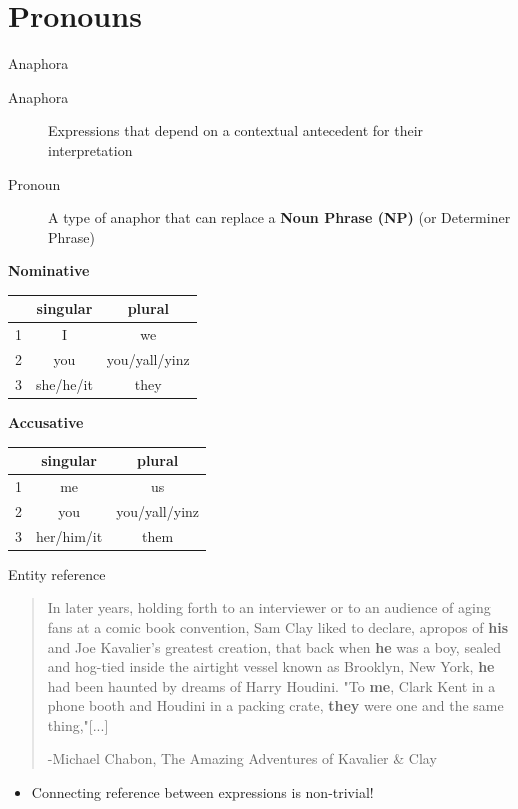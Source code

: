 \documentclass[10pt, compress]{beamer}		%
\begin{document}
\section{Pronouns}
\begin{frame}{Anaphora}
	\begin{description}
		\item[Anaphora] Expressions that depend on a contextual antecedent for their interpretation
		\item[Pronoun] A type of anaphor that can replace a \textbf{Noun Phrase (NP)} (or Determiner Phrase)
	\end{description}

	\begin{table}
		\begin{multicols}{2}

			{\bf Nominative}	\\
			\begin{tabular}{|r|cc|}
				\toprule
					&	singular	&	plural	\\
				\midrule
				1	&	I 	&	we 	\\
				2	&	you 	&	you/yall/yinz 	\\
				3	&	she/he/it &	they 	\\
				\bottomrule
			\end{tabular}

			{\bf Accusative}	\\
			\begin{tabular}{|r|cc|}
				\toprule
					&	singular	&	plural	\\
				\midrule
				1	&	me 	&	us 	\\
				2	&	you 	&	you/yall/yinz 	\\
				3	&	her/him/it &	them 	\\
				\bottomrule
			\end{tabular}
		\end{multicols}
	\end{table}
\end{frame}

\begin{frame}{Entity reference}
	\begin{quote}
		In later years, holding forth to an interviewer or to an audience of aging fans at a comic book convention, Sam Clay liked to declare, apropos of \textbf{his} and Joe Kavalier's greatest creation, that back when \textbf{he} was a boy, sealed and hog-tied inside the airtight vessel known as Brooklyn, New York, \textbf{he} had been haunted by dreams of Harry Houdini. "To \textbf{me}, Clark Kent in a phone booth and Houdini in a packing crate, \textbf{they} were one and the same thing,"[...]

		\medskip
		-Michael Chabon, The Amazing Adventures of Kavalier \& Clay
	\end{quote}

	\pause

	\begin{itemize}
		\item Connecting reference between expressions is non-trivial!
	\end{itemize}
\end{frame}
\end{document}
